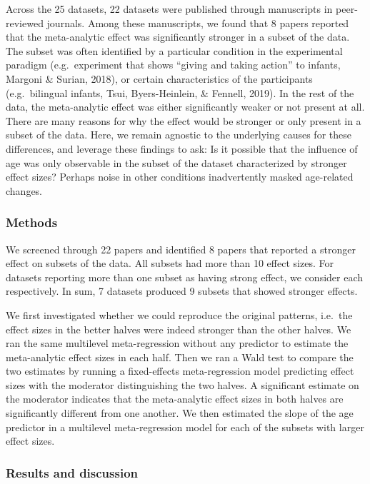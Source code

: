 \documentclass[
  man]{apa6}
\begin{document}
Across the 25 datasets, 22 datasets were published through manuscripts in peer-reviewed journals. Among these manuscripts, we found that 8 papers reported that the meta-analytic effect was significantly stronger in a subset of the data. The subset was often identified by a particular condition in the experimental paradigm (e.g.~experiment that shows ``giving and taking action'' to infants, Margoni \& Surian, 2018), or certain characteristics of the participants (e.g.~bilingual infants, Tsui, Byers-Heinlein, \& Fennell, 2019). In the rest of the data, the meta-analytic effect was either significantly weaker or not present at all. There are many reasons for why the effect would be stronger or only present in a subset of the data. Here, we remain agnostic to the underlying causes for these differences, and leverage these findings to ask: Is it possible that the influence of age was only observable in the subset of the dataset characterized by stronger effect sizes? Perhaps noise in other conditions inadvertently masked age-related changes.

\hypertarget{methods-3}{%
\subsubsection{Methods}\label{methods-3}}

We screened through 22 papers and identified 8 papers that reported a stronger effect on subsets of the data. All subsets had more than 10 effect sizes. For datasets reporting more than one subset as having strong effect, we consider each respectively. In sum, 7 datasets produced 9 subsets that showed stronger effects.

We first investigated whether we could reproduce the original patterns, i.e.~the effect sizes in the better halves were indeed stronger than the other halves. We ran the same multilevel meta-regression without any predictor to estimate the meta-analytic effect sizes in each half. Then we ran a Wald test to compare the two estimates by running a fixed-effects meta-regression model predicting effect sizes with the moderator distinguishing the two halves. A significant estimate on the moderator indicates that the meta-analytic effect sizes in both halves are significantly different from one another. We then estimated the slope of the age predictor in a multilevel meta-regression model for each of the subsets with larger effect sizes.

\hypertarget{results-and-discussion-2}{%
\subsubsection{Results and discussion}\label{results-and-discussion-2}}
\end{document}
